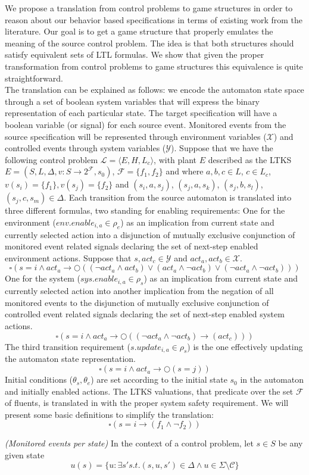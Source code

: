 We propose a translation from control problems to game structures in order
to reason about our behavior based specifications in terms of existing 
work from the literature.  
Our goal is to get a game structure that properly emulates the meaning
of the source control problem.  The idea is that both structures should
satisfy equivalent sets of LTL formulas.  We show that given the proper
transformation from control problems to game structures this equivalence 
is quite straightforward.\\
The translation can be explained as follows:
we encode the automaton state space through a set of boolean system variables
that will express the binary representation of each particular state.  The 
target specification will have a boolean variable (or signal) for each source
event.  Monitored events from the source specification will be 
represented through environment variables ($\mathcal{X}$) and
controlled events through system variables ($\mathcal{Y}$).  
Suppose that we have the following control problem $\mathcal{L}=\langle E, H, L_c\rangle$,
with plant $E$ described as the LTKS $E = (S, L,\Delta, v:S \rightarrow 2^{\mathcal{F}} ,s_0)$, $\mathcal{F}=\{f_1, f_2 \}$ and where
$a,b,c \in L$, $c \in L_c$, $v(s_i)=\{ f_1 \}, v(s_j)=\{f_2\}$ and
$(s_i, a, s_j)$,
$(s_j, a, s_k)$,
$(s_j,b,s_l)$,
$(s_j, c, s_m) \in \Delta$.
Each transition from the source automaton is translated into three 
different formulas, two standing for enabling requirements:
One for the environment ($env.enable_{i,a} \in \rho_e$) as an implication from current state 
and currently selected action into a disjunction of mutually exclusive conjunction 
of monitored event related signals declaring the set of next-step enabled
environment actions. Suppose that $s, act_c \in \mathcal{Y}$
and $act_a, act_b \in \mathcal{X}$.
\[
\square(s = i \wedge act_a \rightarrow \Circle((\neg act_a \wedge act_b)\vee(act_a \wedge \neg act_b) \vee (\neg act_a \wedge \neg act_b)))\]
One for the system ($sys.enable_{i,a} \in \rho_s$) as an implication from current state
and currently selected action into another implication 
from the negation of all monitored events to the
disjunction of mutually exclusive conjunction of controlled
event related signals declaring the set of next-step enabled
system actions.
\[
\square(s = i \wedge act_a \rightarrow \Circle((\neg act_a \wedge \neg act_b)\rightarrow (act_c)))\]
The third transition requirement ($s.update_{i,a} \in \rho_s$) is the one 
effectively updating the automaton state representation.
\[
\square(s = i \wedge act_a \rightarrow \Circle(s = j))\]
Initial conditions ($\theta_s, \theta_e$) are set according to the initial state 
$s_0$ in the automaton and initially enabled actions.
The LTKS valuations, that predicate over the set $\mathcal{F}$ of 
fluents, is translated in with the proper system safety requirement.
We will present some basic definitions to simplify the translation:
\[
\square(s = i \rightarrow (f_1 \wedge \neg f_2))\]
\begin{definition}\label{def:state-u-events}\emph{(Monitored events per state)}
In the context of a control problem, let $s \in S$ be any given state 
\[u(s) = \{ u: \exists s' s.t. (s,u,s') \in \Delta \wedge u \in \Sigma \setminus \mathcal{C} \}\]
\end{definition}

